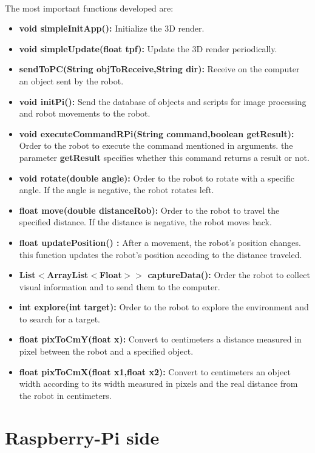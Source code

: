 \documentclass[12pt]{report}
\begin{document}
\paragraph{}
The most important functions developed are:
\begin{itemize}
    \item  \textbf{void simpleInitApp():} Initialize the 3D render. 
    \item \textbf{void simpleUpdate(float tpf):} Update the 3D render periodically.
    \item \textbf{sendToPC(String objToReceive,String dir):} Receive on the computer an object sent by the robot.
    \item \textbf{void initPi():} Send the database of objects and scripts for image processing and robot movements to the robot.
    \item \textbf{void executeCommandRPi(String command,boolean getResult):} Order to the robot to execute the command mentioned in arguments. the parameter \textbf{getResult} specifies whether this command returns a result or not.
    \item \textbf{void rotate(double angle):} Order to the robot to rotate with a specific angle. If the angle is negative, the robot rotates left. 
    \item \textbf{float move(double distanceRob):} Order to the robot to travel the specified distance. If the distance is negative, the robot moves back.
    \item \textbf{float updatePosition() :} After a movement, the robot's position changes. this function updates the robot's position accoding to the distance traveled.
    \item \textbf{List$<$ArrayList$<$Float$>>$  captureData():} Order the robot to collect visual information and to send them to the computer.
    \item \textbf{int explore(int target):} Order to the robot to explore the environment and to search for a target.
    \item \textbf{float pixToCmY(float x):} Convert to centimeters a distance measured in pixel between the robot and a specified object.
    \item \textbf{float pixToCmX(float x1,float x2):} Convert to centimeters an object width according to its width measured in pixels and the real distance from the robot in centimeters.
\end{itemize}
\section{Raspberry-Pi side}
\end{document}
